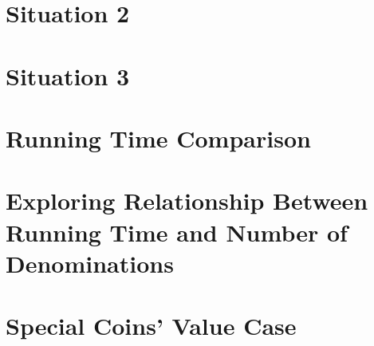 \documentclass[11pt]{scrreprt}
\begin{document}
\section{Situation 2}

\section{Situation 3}

\section{Running Time Comparison}

\section{Exploring Relationship Between Running Time and Number of Denominations}

\section{Special Coins' Value Case}
\end{document}
